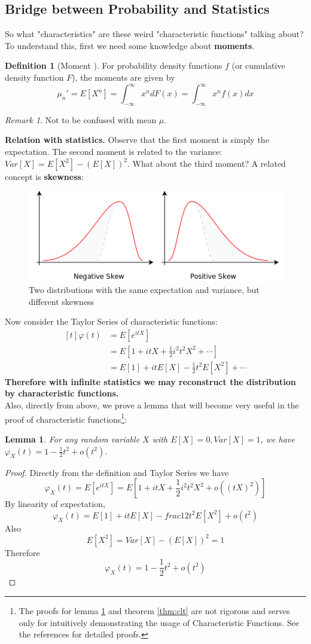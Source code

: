 \documentclass{article}
\theoremstyle{definition}
\newtheorem{definition}{Definition}[section]
\theoremstyle{plain}
\newtheorem{lemma}{Lemma}[section]
\theoremstyle{remark}
\newtheorem*{remark}{Remark}
\begin{document}
\subsection{Bridge between Probability and Statistics}
So what "characteristics" are these weird "characteristic functions" talking about? To understand this, first we need some knowledge about \textbf{moments}.
\begin{definition}[Moment \cite{wiki:moment}]
For probability density functions $f$ (or cumulative density function $F$), the moments are given by
$$\mu_n' = E[X^n] = \int_{-\infty}^\infty x^ndF(x) = \int_{-\infty}^\infty x^nf(x)dx $$
\end{definition}
\begin{remark}
Not to be confused with mean $\mu$. 
\end{remark}
\noindent\textbf{Relation with statistics.} Observe that the first moment is simply the expectation. The second moment is related to the variance: $Var[X]=E[X^2]-(E[X])^2$. What about the third moment? A related concept is \textbf{skewness}\cite{wiki:skewness}:
\begin{figure}[H]
	\centering
	\includegraphics[width=0.8\linewidth]{img/Negative_and_positive_skew_diagrams_(English)}
	\caption{Two distributions with the same expectation and variance, but different skewness} 
	\label{fig:skewness}
\end{figure}
Now consider the Taylor Series of characteristic functions:
$$\begin{aligned}[t]
\varphi(t) & =E[e^{itX}]  \\
& =E[1+itX+\frac12i^2t^2X^2+\cdots] \\
& =E[1] + itE[X]-\frac12t^2E[X^2] + \cdots
\end{aligned}$$
\textbf{Therefore with infinite statistics we may reconstruct the distribution by characteristic functions.}\\
Also, directly from above, we prove a lemma that will become very useful in the proof of characteristic functions\footnote{The proofs for lemma \ref{lem:clt} and theorem \ref{thm:clt} are not rigorous and serves only for intuitively demonstrating the usage of Characteristic Functions. See the references\cite{waterloo,nus} for detailed proofs.}:
\begin{lemma}
	For any random variable $X$ with $E[X]=0,Var[X]=1$, we have $\varphi_X(t)=1-\frac12t^2+o(t^2)$.
	\label{lem:clt}
\end{lemma}
\begin{proof}
	Directly from the definition and Taylor Series we have
	$$\varphi_X(t)=E[e^{itX}]=E[1+itX+\frac12i^2t^2X^2+o((tX)^2)]$$
	By linearity of expectation,
	$$\varphi_X(t)=E[1]+itE[X]-frac12t^2E[X^2]+o(t^2)$$
	Also
	$$E[X^2]=Var[X]-(E[X])^2=1$$
	Therefore $$\varphi_X(t)=1-\frac12t^2+o(t^2)$$
\end{proof}
\end{document}
